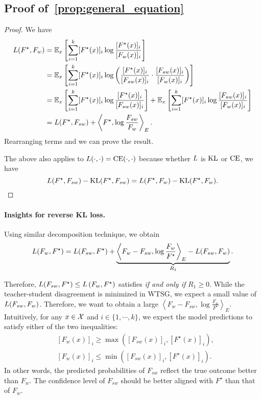 \subsection{Proof of~\cref{prop:general_equation}} \label{proof:general_equation}

\begin{proof}
We have
\begin{align*}
    L(F^\star, F_w) &= \mathbb{E}_x \left[ \sum_{i=1}^k [F^\star(x)]_i \log \frac{[F^\star(x)]_i}{[F_w(x)]_i} \right] \\
    &= \mathbb{E}_x \left[ \sum_{i=1}^k [F^\star(x)]_i \log \left( \frac{[F^\star(x)]_i}{[F_{sw}(x)]_i} \cdot \frac{[F_{sw}(x)]_i}{[F_w(x)]_i} \right) \right] \\
    &= \mathbb{E}_x \left[ \sum_{i=1}^k [F^\star(x)]_i \log  \frac{[F^\star(x)]_i}{[F_{sw}(x)]_i} \right] + \mathbb{E}_x \left[ \sum_{i=1}^k [F^\star(x)]_i \log  \frac{[F_{sw}(x)]_i}{[F_w(x)]_i} \right] \\
    &=L(F^\star, F_{sw}) + \left \langle F^\star, \log{\frac{F_{sw}}{F_w}} \right \rangle_E.
\end{align*}
Rearranging terms and we can prove the result.

The above also applies to $L(\cdot, \cdot)=\mathrm{CE}(\cdot, \cdot)$ because whether $L$ is $\mathrm{KL}$ or $\mathrm{CE}$, we have 
$$L(F^\star, F_{sw})-\mathrm{KL}(F^\star, F_{sw}) = L(F^\star, F_{w})-\mathrm{KL}(F^\star, F_{w}).$$
\end{proof}



\paragraph{Insights for reverse KL loss.}
Using similar decomposition technique, we obtain
\begin{align*}
    L(F_w, F^\star) = L(F_{sw}, F^\star) + \underbrace{\left \langle F_w-F_{sw}, \log{\frac{F_w}{F^\star}} \right \rangle_E - L(F_{sw}, F_w)}_{R_1}.
\end{align*}

Therefore, $L(F_{sw}, F^\star) \le L\left( F_w, F^\star \right)$ satisfies \textit{if and only if} $R_1 \ge 0$.
While the teacher-student disagreement is minimized in WTSG, we expect a small value of $L(F_{sw}, F_w)$.
Therefore, we want to obtain a large $\left \langle F_w-F_{sw}, \log{\frac{F_w}{F^\star}} \right \rangle_E$.
Intuitively, for any $x \in \mathcal{X}$ and $i \in \{ 1, \cdots, k  \}$, we expect the model predictions to satisfy either of the two inequalities:
\begin{align}
    & [F_w(x)]_i \ge \max([F_{sw}(x)]_i ,[F^\star(x)]_i), \label{prop_2_ineq_1-r} \\ 
    & [F_w(x)]_i \le \min([F_{sw}(x)]_i ,[F^\star(x)]_i). \label{prop_2_ineq_2-r}
\end{align}
In other words, the predicted probabilities of $F_{sw}$ reflect the true outcome better than $F_w$.
The confidence level of $F_{sw}$ should be better aligned with $F^\star$ than that of $F_w$.




